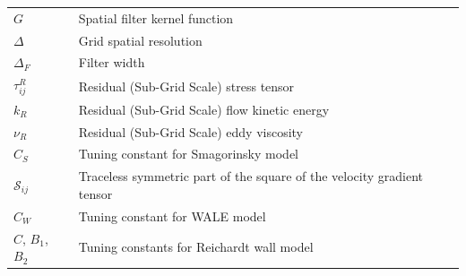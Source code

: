\documentclass[12pt, a4paper, twoside, openright]{book}
\begin{document}
\begin{longtable}{p{} p{}}
	\addlinespace
	\addlinespace
	$G$                                          & Spatial filter kernel function                                               \\
	$\Delta$                                     & Grid spatial resolution                                                      \\
	$\Delta_F$                                   & Filter width                                                                 \\
	$\tau_{ij}^R$                                & Residual (Sub-Grid Scale) stress tensor                                      \\
	$k_R$                                        & Residual (Sub-Grid Scale) flow kinetic energy                                \\
	$\nu_R$                                      & Residual (Sub-Grid Scale) eddy viscosity                                     \\
	$C_S$                                        & Tuning constant for Smagorinsky model                                        \\
	$\mathcal{S}_{ij}$                           & Traceless symmetric part of the square of the velocity gradient tensor       \\
	$C_W$                                        & Tuning constant for WALE model                                               \\
	$C$, $B_1$, $B_2$                            & Tuning constants for Reichardt wall model                                               \\


\end{longtable}
\end{document}
